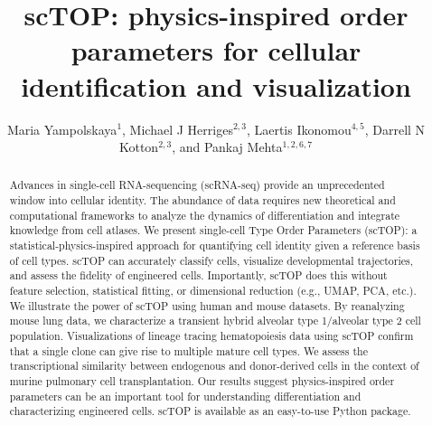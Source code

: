 \documentclass[vruler,JEB]{COB}%
\begin{document}

\title{scTOP: physics-inspired order parameters for cellular identification and visualization}

\author{Maria Yampolskaya$^{1}$, Michael J Herriges$^{2, 3}$, Laertis Ikonomou$^{4, 5}$, Darrell N Kotton$^{2, 3}$, and Pankaj Mehta$^{1, 2, 6, 7}$}

\address{
}



\maketitle

\begin{abstract}
Advances in single-cell RNA-sequencing (scRNA-seq) provide an unprecedented window into cellular identity. The abundance of data requires new theoretical and computational frameworks to analyze the dynamics of differentiation and integrate knowledge from cell atlases. We present single-cell Type Order Parameters (scTOP): a statistical-physics-inspired approach for quantifying cell identity given a reference basis of cell types. scTOP can accurately classify cells, visualize developmental trajectories, and assess the fidelity of engineered cells. Importantly, scTOP does this without feature selection, statistical fitting, or dimensional reduction (e.g., UMAP, PCA, etc.). We illustrate the power of scTOP using human and mouse datasets. By reanalyzing mouse lung data, we characterize a transient hybrid alveolar type 1/alveolar type 2 cell population. Visualizations of lineage tracing hematopoiesis data using scTOP confirm that a single clone can give rise to multiple mature cell types. We assess the transcriptional similarity between endogenous and donor-derived cells in the context of murine pulmonary cell transplantation. Our results suggest physics-inspired order parameters can be an important tool for understanding differentiation and characterizing engineered cells. scTOP is available as an easy-to-use Python package.
\end{abstract}
\end{document}
